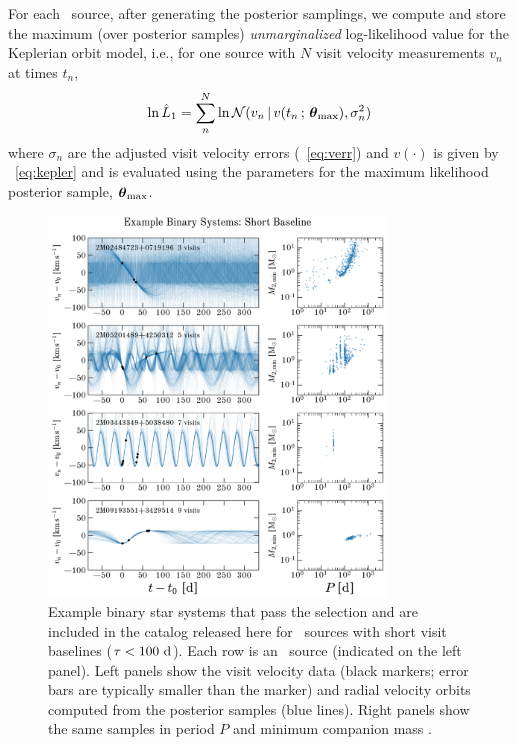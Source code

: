 \documentclass[modern]{aastex63}
\begin{document}
For each \apogee\ source, after generating the posterior samplings, we compute
and store the maximum (over posterior samples) \emph{unmarginalized}
log-likelihood value for the Keplerian orbit model, i.e., for one source with
$N$ visit velocity measurements $v_n$ at times $t_n$,
\begin{equation}
    \ln \hat{L}_1 = \sum_n^N \ln \mathcal{N}(v_n \given
        v(t_n \,;\, \bs{\theta}_{\mathrm{max}}), \sigma_n^2)
\end{equation}
where $\sigma_n$ are the adjusted visit velocity errors
(\equationname~\ref{eq:verr}) and $v(\cdot)$ is given by
\equationname~\ref{eq:kepler} and is evaluated using the parameters for the
maximum likelihood posterior sample, $\boldsymbol{\theta}_{\mathrm{max}}$.

\begin{figure}[!t]
    \begin{center}
    \includegraphics[width=0.8\textwidth]{example-binaries-short.pdf}
    \end{center}
    \caption{%
    Example binary star systems that pass the selection and are included in the
    catalog released here for \apogee\ sources with short visit baselines
    ($\tau < 100~\mathrm{d}$).
    Each row is an \apogee\ source (indicated on the left panel).
    Left panels show the visit velocity data (black markers; error bars are
    typically smaller than the marker) and radial velocity orbits computed from
    the posterior samples (blue lines).
    Right panels show the same samples in period $P$ and minimum companion mass
    \mtwomin.
    \label{fig:binary-examples-short}
    }
\end{figure}
\end{document}
